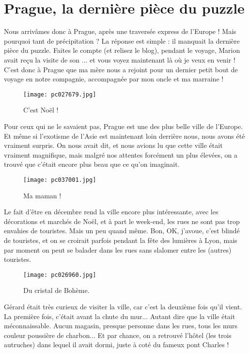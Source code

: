 \documentclass{book}
\begin{document}
\chapter{Prague, la dernière pièce du puzzle}
Nous arrivâmes donc à Prague, après une traversée express de l'Europe ! Mais pourquoi tant de précipitation ? La réponse est simple : il manquait la dernière pièce du puzzle. Faites le compte (et relisez le blog), pendant le voyage, Marion avait reçu la visite de son ... et vous voyez maintenant là où je veux en venir ! C'est donc à Prague que ma mère nous a rejoint pour un dernier petit bout de voyage en notre compagnie, accompagnée par mon oncle et ma marraine !


\begin{figure}[h]
\centering
\texttt{[image: pc027679.jpg]}
\caption*{C'est Noël !}
\end{figure}

Pour ceux qui ne le savaient pas, Prague est une des plus belle ville de l'Europe. Et même si l'exotisme de l'Asie est maintenant loin derrière nous, nous avons été vraiment surpris. On nous avait dit, et nous avions lu que cette ville était vraiment magnifique, mais malgré nos attentes forcément un plus élevées, on a trouvé que c'était encore plus beau que ce qu'on imaginait.


\begin{figure}[h]
\centering
\texttt{[image: pc037001.jpg]}
\caption*{Ma maman !}
\end{figure}

Le fait d'être en décembre rend la ville encore plus intéressante, avec les décorations et marchés de Noël, et à part le week-end, les rues ne sont pas trop envahies de touristes. Mais un peu quand même. Bon, OK, j'avoue, c'est blindé de touristes, et on se croirait parfois pendant la fête des lumières à Lyon, mais par moment on peut se balader dans les rues sans slalomer entre les (autres) touristes.


\begin{figure}[h]
\centering
\texttt{[image: pc026960.jpg]}
\caption*{Du cristal de Bohème.}
\end{figure}

Gérard était très curieux de visiter la ville, car c'est la deuxième fois qu'il vient. La première fois, c'était avant la chute du mur... Autant dire que la ville était méconnaissable. Aucun magasin, presque personne dans les rues, tous les murs couleur poussière de charbon... Et par chance, on a retrouvé l'hôtel (les trois autruches) dans lequel il avait dormi, juste à coté du fameux pont Charles !
\end{document}
